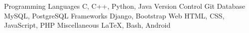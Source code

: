 
\begin{cvskills}
  \cvskill
    {Programming Languages}
    {C, C++, Python, Java}
  \cvskill
    {Version Control}
    {Git}
  \cvskill
    {Database}
    {MySQL, PostgreSQL}
  \cvskill
    {Frameworks}
    {Django, Bootstrap}
  \cvskill
    {Web}
    {HTML, CSS, JavaScript, PHP}
  \cvskill
    {Miscellaneous}
    {\LaTeX, Bash, Android}
\end{cvskills}